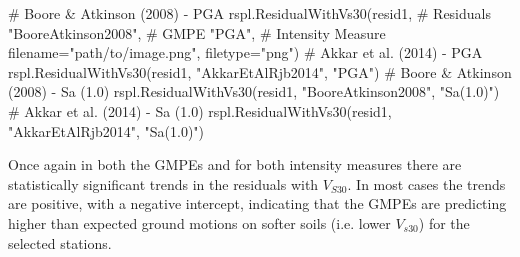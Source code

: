  \begin{python}[frame=single]
# Boore & Atkinson (2008)  - PGA
rspl.ResidualWithVs30(resid1,  # Residuals
                      "BooreAtkinson2008",  # GMPE
                      "PGA",   # Intensity Measure
                      filename="path/to/image.png",
                      filetype="png")
# Akkar et al. (2014)  - PGA
rspl.ResidualWithVs30(resid1, "AkkarEtAlRjb2014", "PGA") 
# Boore & Atkinson (2008)  - Sa (1.0)
rspl.ResidualWithVs30(resid1, "BooreAtkinson2008", "Sa(1.0)") 
# Akkar et al. (2014)  - Sa (1.0)
rspl.ResidualWithVs30(resid1, "AkkarEtAlRjb2014", "Sa(1.0)")                         
\end{python}

Once again in both the GMPEs and for both intensity measures there are statistically significant trends in the residuals with $V_{S30}$. In most cases the trends are positive, with a negative intercept, indicating that the GMPEs are predicting higher than expected ground motions on softer soils (i.e. lower $V_{s30}$) for the selected stations.

